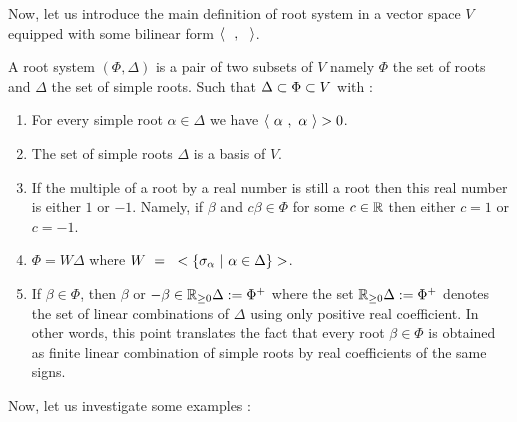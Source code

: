 Now, let us introduce the main definition of root system in a vector space $V$ equipped with some bilinear form $\langle\text{ } \text{ },\text{ }\text{ }\rangle$.
\begin{definition}
	A root system $(\Phi,\Delta)$ is a pair of two subsets of $V$ namely $\Phi$ the set of roots and $\Delta$ the set of simple roots. Such that $\Delta\subset \Phi\subset V$ with :
	\begin{enumerate}[({R}1)]
		\item For every simple root $\alpha\in \Delta$ we have $\langle\text{ } \alpha\text{ },\text{ }\alpha\text{ }\rangle>0$.
		\item The set of simple roots $\Delta$ is a basis of $V$.
		\item If the multiple of a root by a real number is still a root then this real number is either $1$ or $-1$. Namely, if $\beta$ and $c\beta\in \Phi$ for some $c\in \mathbb R$ then either $c=1$ or $c=-1$.
		\item $\Phi=W\Delta$ where $W\text{ }=\text{ } <\{\sigma_\alpha\text{ } \lvert\text{ } \alpha\in \Delta\}>$.
		\item If $\beta\in \Phi$, then $\beta$ or $-\beta\in \mathbb R_{\geq 0}\Delta:=\Phi^+$ where the set $\mathbb R_{\geq 0}\Delta:=\Phi^+$ denotes the set of linear combinations of $\Delta$ using only positive real coefficient. In other words, this point translates the fact that every root $\beta\in \Phi$ is obtained as finite linear combination of simple roots by real coefficients of the same signs.
	\end{enumerate}
\end{definition}
Now, let us investigate some examples :
